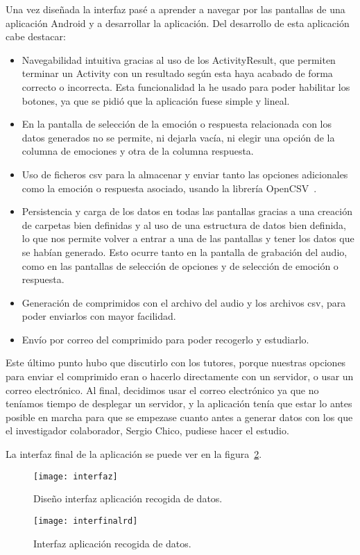 Una vez diseñada la interfaz pasé a aprender a navegar por las pantallas de una aplicación Android y a desarrollar la aplicación. Del desarrollo de esta aplicación cabe destacar:
\begin{itemize}
	\item Navegabilidad intuitiva gracias al uso de los ActivityResult, que permiten terminar un Activity con un resultado según esta haya acabado de forma correcto o incorrecta. Esta funcionalidad la he usado para poder habilitar los botones, ya que se pidió que la aplicación fuese simple y lineal.
	\item En la pantalla de selección de la emoción o respuesta relacionada con los datos generados no se permite, ni dejarla vacía, ni elegir una opción de la columna de emociones y otra de la columna respuesta.
	\item Uso de ficheros csv para la almacenar y enviar tanto las opciones adicionales como la emoción o respuesta asociado, usando la librería OpenCSV~\cite{opencsv}.
	\item Persistencia y carga de los datos en todas las pantallas gracias a una creación de carpetas bien definidas y al uso de una estructura de datos bien definida, lo que nos permite volver a entrar a una de las pantallas y tener los datos que se habían generado. Esto ocurre tanto en la pantalla de grabación del audio, como en las pantallas de selección de opciones y de selección de emoción o respuesta.
	\item Generación de comprimidos con el archivo del audio y los archivos csv, para poder enviarlos con mayor facilidad.
	\item Envío por correo del comprimido para poder recogerlo y estudiarlo. 
\end{itemize}

Este último punto hubo que discutirlo con los tutores, porque nuestras opciones para enviar el comprimido eran o hacerlo directamente con un servidor, o usar un correo electrónico. Al final, decidimos usar el correo electrónico ya que no teníamos tiempo de desplegar un servidor, y la aplicación tenía que estar lo antes posible en marcha para que se empezase cuanto antes a generar datos con los que el investigador colaborador, Sergio Chico, pudiese hacer el estudio.

La interfaz final de la aplicación se puede ver en la figura~\ref{fig:interfinalrd}.
\begin{figure}
	\centering
	\texttt{[image: interfaz]}
	\caption{Diseño interfaz aplicación recogida de datos.}
	\label{fig:interrd}
\end{figure}
\begin{figure}
	\centering
	\texttt{[image: interfinalrd]}
	\caption{Interfaz aplicación recogida de datos.}
	\label{fig:interfinalrd}
\end{figure}

